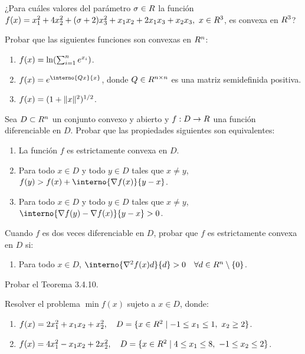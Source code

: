 \begin{exercise}\label{v1:ejer:3.4.17}
 ¿Para cuáles valores del parámetro $\sigma \in R$ la función $f(x) = x_1^2 + 4x_2^2 + (\sigma + 2)x_3^2 + x_1 x_2 + 2x_1 x_3 + x_2 x_3, \ x \in R^3$, es convexa en $R^3$?
\end{exercise}

\begin{exercise}\label{v1:ejer:3.4.18}
 Probar que las siguientes funciones son convexas en $R^n$:
 \begin{enumerate}[label=(\alph*)]
  \item $f(x) = \ln(\sum_{i=1}^n e^{x_i})$.
  \item $f(x) = \E^{\interno{Qx}{x}}$, donde $Q \in R^{n \times n}$ es una matriz semidefinida positiva.
  \item $f(x) = (1 + \lVert x\rVert^2)^{1/2}$.
 \end{enumerate}
\end{exercise}

\begin{exercise}\label{v1:ejer:3.4.19}
 Sea $D \subset R^n$ un conjunto convexo y abierto y $f: D \to R$ una función diferenciable en $D$. Probar que las propiedades siguientes son equivalentes:
 \begin{enumerate}[label=(\alph*)]
  \item La función $f$ es estrictamente convexa en $D$.
  \item Para todo $x \in D$ y todo $y \in D$ tales que $x \neq y$, $f(y) > f(x) + \interno{\nabla f(x)}{y - x}$.
  \item Para todo $x \in D$ y todo $y \in D$ tales que $x \neq y$, $\interno{\nabla f(y) - \nabla f(x)}{y - x} > 0$.
 \end{enumerate}
 Cuando $f$ es dos veces diferenciable en $D$, probar que $f$ es estrictamente convexa en $D$ si:
 \begin{enumerate}
  \item[(d)] Para todo $x \in D$, $\interno{\nabla^2 f(x)d}{d} > 0 \quad \forall d \in \Rn \setminus \{0\}$.
 \end{enumerate}
\end{exercise}

\begin{exercise}\label{v1:ejer:3.4.20}
 Probar el Teorema 3.4.10.
\end{exercise}

\begin{exercise}\label{v1:ejer:3.4.21}
 Resolver el problema $\min f(x)$ sujeto a $x \in D$, donde:
 \begin{enumerate}[label=(\alph*)]
  \item $f(x) = 2x_1^2 + x_1 x_2 + x_2^2, \quad D = \{ x \in R^2 \mid -1 \le x_1 \le 1, \ x_2 \ge 2 \}$.
  \item $f(x) = 4x_1^2 - x_1 x_2 + 2x_2^2, \quad D = \{ x \in R^2 \mid 4 \le x_1 \le 8, \ -1 \le x_2 \le 2 \}$.
 \end{enumerate}
\end{exercise}

